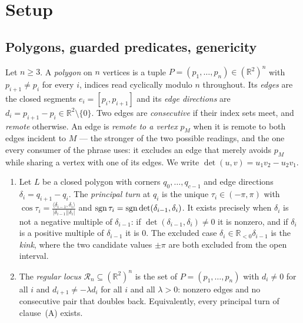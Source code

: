 \section{Setup}\label{sec:setup}

\subsection{Polygons, guarded predicates, genericity}

\begin{definition}[polygon]\label{def:polygon}
Let $n\geq3$. A \emph{polygon} on $n$ vertices is a tuple
$P=(p_1,\dots,p_n)\in(\mathbb{R}^2)^n$ with $p_{i+1}\neq p_i$ for every $i$,
indices read cyclically modulo $n$ throughout. Its \emph{edges} are the closed
segments $e_i=[p_i,p_{i+1}]$ and its \emph{edge directions} are
$d_i=p_{i+1}-p_i\in\mathbb{R}^2\setminus\{0\}$. Two edges are \emph{consecutive}
if their index sets meet, and \emph{remote} otherwise. An edge is \emph{remote
to a vertex} $p_M$ when it is remote to both edges incident to $M$ --- the
stronger of the two possible readings, and the one every consumer of the phrase
uses: it excludes an edge that merely avoids $p_M$ while sharing a vertex with
one of its edges. We write
$\det(u,v)=u_1v_2-u_2v_1$.
\end{definition}

\begin{definition}\label{def:regular}
\begin{enumerate}
\item[(A)] Let $L$ be a closed polygon with corners $q_0,\dots,q_{c-1}$ and edge directions
$\delta_i=q_{i+1}-q_i$. The \emph{principal turn} at $q_i$ is the unique
$\tau_i\in(-\pi,\pi)$ with
$\cos\tau_i=\frac{\langle\delta_{i-1},\delta_i\rangle}{|\delta_{i-1}||\delta_i|}$
and $\operatorname{sgn}\tau_i=\operatorname{sgn}\det(\delta_{i-1},\delta_i)$. It exists precisely when
$\delta_i$ is not a negative multiple of $\delta_{i-1}$: if
$\det(\delta_{i-1},\delta_i)\neq0$ it is nonzero, and if $\delta_i$ is a
positive multiple of $\delta_{i-1}$ it is $0$. The excluded case
$\delta_i\in\mathbb R_{<0}\delta_{i-1}$ is the \emph{kink}, where the two
candidate values $\pm\pi$ are both excluded from the open interval.
\item[(B)] The \emph{regular locus} $\mathcal R_n\subseteq(\mathbb R^2)^n$ is the set of
$P=(p_1,\dots,p_n)$ with $d_i\neq0$ for all $i$ and $d_{i+1}\neq-\lambda d_i$
for all $i$ and all $\lambda>0$: nonzero edges and no consecutive pair that
doubles back. Equivalently, every principal turn of
clause~(A) exists.
\end{enumerate}
\end{definition}

